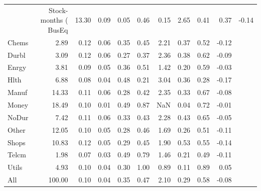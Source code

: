 \begin{tabular}{lrrrrrrrrr}
\toprule
 & Stock-months (%
\midrule
BusEq & 13.30 & 0.09 & 0.05 & 0.46 & 0.15 & 2.65 & 0.41 & 0.37 & -0.14 \\
Chems & 2.89 & 0.12 & 0.06 & 0.35 & 0.45 & 2.21 & 0.37 & 0.52 & -0.12 \\
Durbl & 3.09 & 0.12 & 0.06 & 0.27 & 0.37 & 2.36 & 0.38 & 0.62 & -0.09 \\
Enrgy & 3.81 & 0.09 & 0.05 & 0.36 & 0.51 & 1.42 & 0.20 & 0.59 & -0.03 \\
Hlth & 6.88 & 0.08 & 0.04 & 0.48 & 0.21 & 3.04 & 0.36 & 0.28 & -0.17 \\
Manuf & 14.33 & 0.11 & 0.06 & 0.28 & 0.42 & 2.35 & 0.33 & 0.67 & -0.08 \\
Money & 18.49 & 0.10 & 0.01 & 0.49 & 0.87 & NaN & 0.04 & 0.72 & -0.01 \\
NoDur & 7.42 & 0.11 & 0.06 & 0.33 & 0.43 & 2.28 & 0.43 & 0.65 & -0.05 \\
Other & 12.05 & 0.10 & 0.05 & 0.28 & 0.46 & 1.69 & 0.26 & 0.51 & -0.11 \\
Shops & 10.83 & 0.12 & 0.05 & 0.29 & 0.45 & 1.90 & 0.53 & 0.55 & -0.14 \\
Telcm & 1.98 & 0.07 & 0.03 & 0.49 & 0.79 & 1.46 & 0.21 & 0.49 & -0.11 \\
Utils & 4.93 & 0.10 & 0.04 & 0.30 & 1.00 & 0.89 & 0.11 & 0.89 & 0.05 \\
All & 100.00 & 0.10 & 0.04 & 0.35 & 0.47 & 2.10 & 0.29 & 0.58 & -0.08 \\
\bottomrule
\end{tabular}

